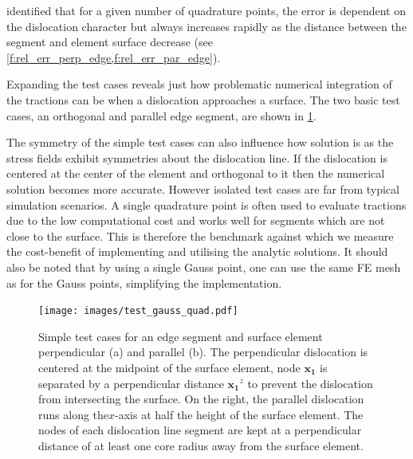 \documentclass[11pt]{iopart}
\begin{document}
\citet{Queyreau} identified that for a given number of quadrature points, the error is dependent on the dislocation character but always increases rapidly as the distance between the segment and element surface decrease (see \cref{f:rel_err_perp_edge,f:rel_err_par_edge}).

Expanding the test cases reveals just how problematic numerical integration of the tractions can be when a dislocation approaches a surface. The two basic test cases, an orthogonal and parallel edge segment, are shown in \cref{f:gauss_quad_test}.

The symmetry of the simple test cases can also influence how solution is as the stress fields exhibit symmetries about the dislocation line. If the dislocation is centered at the center of the element and orthogonal to it then the numerical solution becomes more accurate. However isolated test cases are far from typical simulation scenarios. A single quadrature point is often used to evaluate tractions due to the low computational cost and works well for segments which are not close to the surface. This is therefore the benchmark against which we measure the cost-benefit of implementing and utilising the analytic solutions. It should also be noted that by using a single Gauss point, one can use the same FE mesh as for the Gauss points, simplifying the implementation.
%		
\begin{figure}
    \centering
    \texttt{[image: images/test\_gauss\_quad.pdf]}
    \caption{Simple test cases for an edge segment and surface element perpendicular (a) and parallel (b). The perpendicular dislocation is centered at the midpoint of the surface element, node $\mathbf{x_1}$ is separated by a perpendicular distance $\mathbf{x_1}^z$ to prevent the dislocation from intersecting the surface. On the right, the parallel dislocation runs along the$x$-axis at half the height of the surface element. The nodes of each dislocation line segment are kept at a perpendicular distance of at least one core radius away from the surface element.}
    \label{f:gauss_quad_test}
\end{figure}
\end{document}
